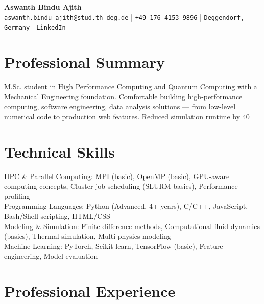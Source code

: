 \documentclass[11pt,a4paper]{article}
\begin{document}
\begin{center}
    {\LARGE\bfseries Aswanth Bindu Ajith}\\[4pt]
    \texttt{aswanth.bindu-ajith@stud.th-deg.de} | \texttt{+49 176 4153 9896} | \texttt{Deggendorf, Germany} | \texttt{LinkedIn}
\end{center}

\section{Professional Summary}
M.Sc. student in High Performance Computing and Quantum Computing with a Mechanical Engineering foundation. Comfortable building high-performance computing, software engineering, data analysis solutions — from low-level numerical code to production web features. Reduced simulation runtime by 40%

\section{Technical Skills}

HPC & Parallel Computing: MPI (basic), OpenMP (basic), GPU-aware computing concepts, Cluster job scheduling (SLURM basics), Performance profiling\\

Programming Languages: Python (Advanced, 4+ years), C/C++, JavaScript, Bash/Shell scripting, HTML/CSS\\

Modeling & Simulation: Finite difference methods, Computational fluid dynamics (basics), Thermal simulation, Multi-physics modeling\\

Machine Learning: PyTorch, Scikit-learn, TensorFlow (basic), Feature engineering, Model evaluation


\section{Professional Experience}
\end{document}
